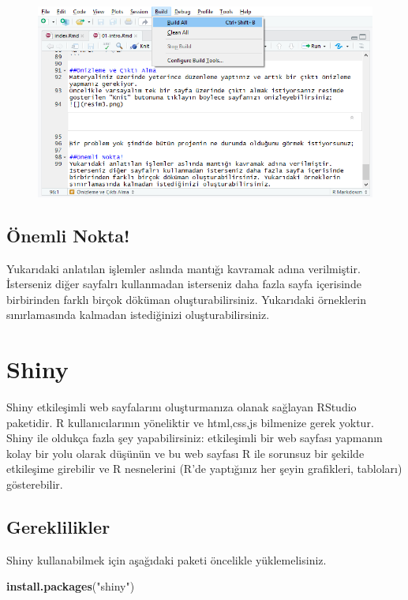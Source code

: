\documentclass[]{book}
\newenvironment{Shaded}{\begin{snugshade}}{\end{snugshade}}
\newcommand{\KeywordTok}[1]{\textcolor[rgb]{0.13,0.29,0.53}{\textbf{#1}}}
\newcommand{\StringTok}[1]{\textcolor[rgb]{0.31,0.60,0.02}{#1}}
\newcommand{\NormalTok}[1]{#1}
\begin{document}
\begin{figure}
\centering
\includegraphics{resim4.png}
\caption{}
\end{figure}

\section{Önemli Nokta!}\label{onemli-nokta}

Yukarıdaki anlatılan işlemler aslında mantığı kavramak adına
verilmiştir. İsterseniz diğer sayfalrı kullanmadan isterseniz daha fazla
sayfa içerisinde birbirinden farklı birçok döküman oluşturabilirsiniz.
Yukarıdaki örneklerin sınırlamasında kalmadan istediğinizi
oluşturabilirsiniz.

\chapter{Shiny}\label{shiny}

Shiny etkileşimli web sayfalarını oluşturmanıza olanak sağlayan RStudio
paketidir. R kullanıcılarının yöneliktir ve html,css,js bilmenize gerek
yoktur.\\
Shiny ile oldukça fazla şey yapabilirsiniz: etkileşimli bir web sayfası
yapmanın kolay bir yolu olarak düşünün ve bu web sayfası R ile sorunsuz
bir şekilde etkileşime girebilir ve R nesnelerini (R'de yaptığınız her
şeyin grafikleri, tabloları) gösterebilir.

\section{Gereklilikler}\label{gereklilikler-2}

Shiny kullanabilmek için aşağıdaki paketi öncelikle yüklemelisiniz.

\begin{Shaded}
\begin{Highlighting}[]
\KeywordTok{install.packages}\NormalTok{(}\StringTok{"shiny"}\NormalTok{)}
\end{Highlighting}
\end{Shaded}
\end{document}
